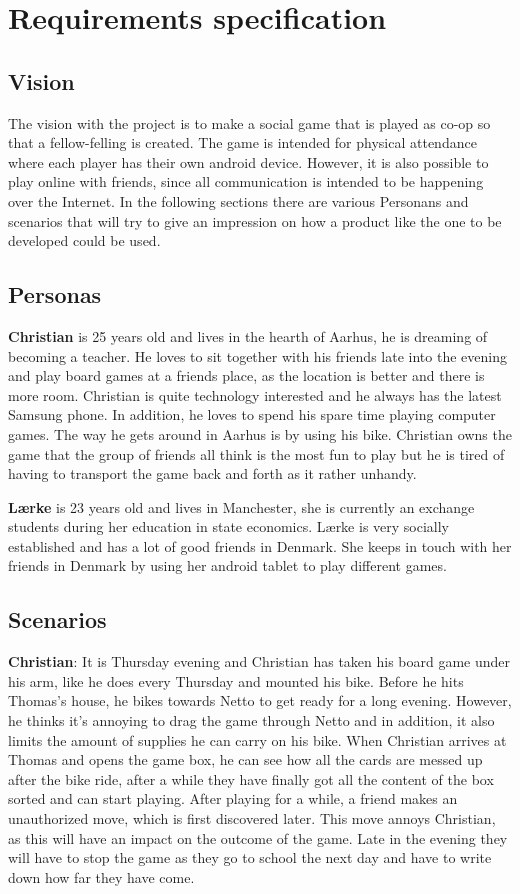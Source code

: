 \pagestyle{Uni}

\chapter{Requirements specification}

\section{Vision}
	The vision with the project is to make a social game that is played as co-op so that a fellow-felling is created.  The game is intended for physical attendance where each player has their own android device. However, it is also possible to play online with friends, since all communication is intended to be happening over the Internet. In the following sections there are various Personans and scenarios that will try to give an impression on how a product like the one to be developed could be used.


\section{Personas}
\textbf{Christian} is 25 years old and lives in the hearth of Aarhus, he is dreaming of becoming a teacher. He loves to sit together with his friends late into the evening and play board games at a friends place, as the location is better and there is more room. Christian is quite technology interested and he always has the latest Samsung phone. In addition, he loves to spend his spare time playing computer games. The way he gets around in Aarhus is by using his bike. Christian owns the game that the group of friends all think is the most fun to play but he is tired of having to transport the game back and forth as it rather unhandy.

\textbf{Lærke} is 23 years old and lives in Manchester, she is currently an exchange students during her education in state economics. Lærke is very socially established and has a lot of good friends in Denmark. She keeps in touch with her friends in Denmark by using her android tablet to play different games.

\section{Scenarios}
\textbf{Christian}:
It is Thursday evening and Christian has taken his board game under his arm, like he does every Thursday and mounted his bike. Before he hits Thomas's house, he bikes towards Netto to get ready for a long evening. However, he thinks it's annoying to drag the game through Netto and in addition, it also limits the amount of supplies he can carry on his bike. When Christian arrives at Thomas and opens the game box, he can see how all the cards are messed up after the bike ride, after a while they have finally got all the content of the box sorted and can start playing. After playing for a while, a friend makes an unauthorized move, which is first discovered later. This move annoys Christian, as this will have an impact on the outcome of the game. Late in the evening they will have to stop the game as they go to school the next day and have to write down how far they have come.

